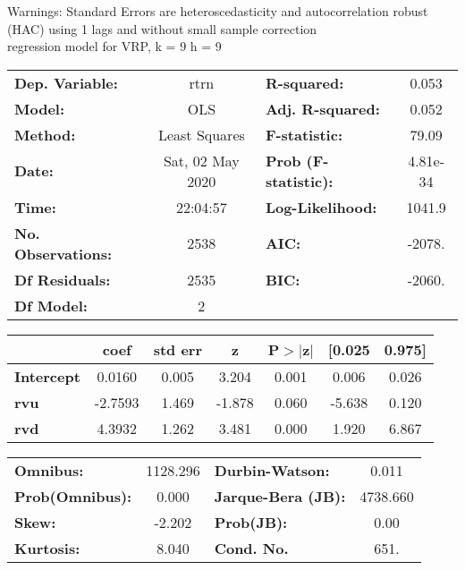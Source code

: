 Warnings: \newline
 [1] Standard Errors are heteroscedasticity and autocorrelation robust (HAC) using 1 lags and without small sample correction\\ 

regression model for VRP, k = 9 h = 9\begin{center}
\begin{tabular}{lclc}
\toprule
\textbf{Dep. Variable:}    &       rtrn       & \textbf{  R-squared:         } &     0.053   \\
\textbf{Model:}            &       OLS        & \textbf{  Adj. R-squared:    } &     0.052   \\
\textbf{Method:}           &  Least Squares   & \textbf{  F-statistic:       } &     79.09   \\
\textbf{Date:}             & Sat, 02 May 2020 & \textbf{  Prob (F-statistic):} &  4.81e-34   \\
\textbf{Time:}             &     22:04:57     & \textbf{  Log-Likelihood:    } &    1041.9   \\
\textbf{No. Observations:} &        2538      & \textbf{  AIC:               } &    -2078.   \\
\textbf{Df Residuals:}     &        2535      & \textbf{  BIC:               } &    -2060.   \\
\textbf{Df Model:}         &           2      & \textbf{                     } &             \\
\bottomrule
\end{tabular}
\begin{tabular}{lcccccc}
                   & \textbf{coef} & \textbf{std err} & \textbf{z} & \textbf{P$> |$z$|$} & \textbf{[0.025} & \textbf{0.975]}  \\
\midrule
\textbf{Intercept} &       0.0160  &        0.005     &     3.204  &         0.001        &        0.006    &        0.026     \\
\textbf{rvu}       &      -2.7593  &        1.469     &    -1.878  &         0.060        &       -5.638    &        0.120     \\
\textbf{rvd}       &       4.3932  &        1.262     &     3.481  &         0.000        &        1.920    &        6.867     \\
\bottomrule
\end{tabular}
\begin{tabular}{lclc}
\textbf{Omnibus:}       & 1128.296 & \textbf{  Durbin-Watson:     } &    0.011  \\
\textbf{Prob(Omnibus):} &   0.000  & \textbf{  Jarque-Bera (JB):  } & 4738.660  \\
\textbf{Skew:}          &  -2.202  & \textbf{  Prob(JB):          } &     0.00  \\
\textbf{Kurtosis:}      &   8.040  & \textbf{  Cond. No.          } &     651.  \\
\bottomrule
\end{tabular}
\end{center}

